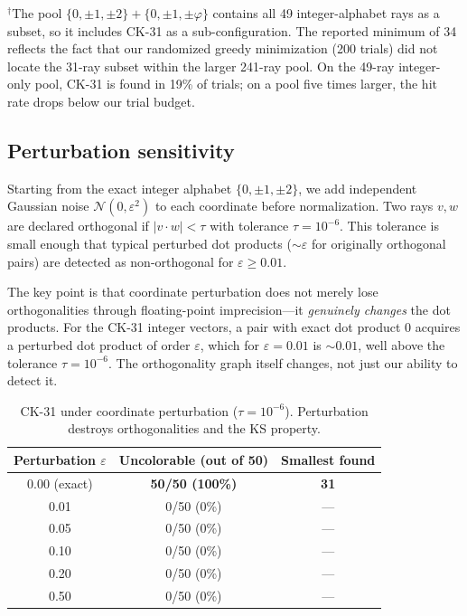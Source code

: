 \documentclass[12pt,a4paper]{article}
\begin{document}
\smallskip\noindent$^\dagger$The pool $\{0,\pm 1,\pm 2\} + \{0,\pm 1,\pm\varphi\}$ contains all 49 integer-alphabet rays as a subset, so it includes CK-31 as a sub-configuration. The reported minimum of 34 reflects the fact that our randomized greedy minimization (200 trials) did not locate the 31-ray subset within the larger 241-ray pool. On the 49-ray integer-only pool, CK-31 is found in 19\% of trials; on a pool five times larger, the hit rate drops below our trial budget.

\subsection{Perturbation sensitivity}\label{sec:perturbation}

Starting from the exact integer alphabet $\{0, \pm 1, \pm 2\}$, we add independent Gaussian noise $\mathcal{N}(0, \varepsilon^2)$ to each coordinate before normalization. Two rays $v, w$ are declared orthogonal if $|v \cdot w| < \tau$ with tolerance $\tau = 10^{-6}$. This tolerance is small enough that typical perturbed dot products ($\sim\varepsilon$ for originally orthogonal pairs) are detected as non-orthogonal for $\varepsilon \geq 0.01$.

The key point is that coordinate perturbation does not merely lose orthogonalities through floating-point imprecision---it \emph{genuinely changes} the dot products. For the CK-31 integer vectors, a pair with exact dot product 0 acquires a perturbed dot product of order $\varepsilon$, which for $\varepsilon = 0.01$ is $\sim 0.01$, well above the tolerance $\tau = 10^{-6}$. The orthogonality graph itself changes, not just our ability to detect it.

\begin{table}[ht]
\centering
\caption{CK-31 under coordinate perturbation ($\tau = 10^{-6}$). Perturbation destroys orthogonalities and the KS property.}
\label{tab:perturbation}
\begin{tabular}{ccc}
\toprule
Perturbation $\varepsilon$ & Uncolorable (out of 50) & Smallest found \\
\midrule
0.00 (exact) & \textbf{50/50 (100\%)} & \textbf{31} \\
0.01 & 0/50 (0\%) & --- \\
0.05 & 0/50 (0\%) & --- \\
0.10 & 0/50 (0\%) & --- \\
0.20 & 0/50 (0\%) & --- \\
0.50 & 0/50 (0\%) & --- \\
\bottomrule
\end{tabular}
\end{table}
\end{document}
